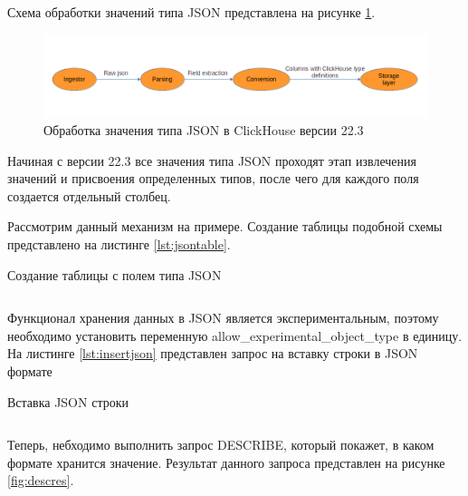 \documentclass[14pt, russian]{scrartcl}
\begin{document}
Схема обработки значений типа JSON представлена на рисунке \ref{fig:jsonprocessing}. 

\begin{figure}[H]
	\centering
	\begin{minipage}[t]{.9\textwidth}
		\centering
		\includegraphics[width=.7\textwidth]{./imgs/ingestion_process_crop.png}
	\end{minipage}
	\caption{Обработка значения типа JSON в ClickHouse версии 22.3}
	\label{fig:jsonprocessing}
\end{figure}

Начиная с версии 22.3 все значения типа JSON проходят
этап извлечения значений и присвоения определенных типов,
после чего для каждого поля создается отдельный столбец.

Рассмотрим данный механизм на примере. Создание таблицы подобной 
схемы представлено на листинге \ref{lst:jsontable}. 


\begin{listing}[H]
	\caption{Создание таблицы с полем типа JSON}
	\label{lst:jsontable}
	\inputminted[style=bw, frame=single,fontsize = \footnotesize, linenos=false, xleftmargin = 1.5em]{sql}{./listings/jsontable.sql}
\end{listing}

Функционал хранения данных в JSON является экспериментальным, поэтому
необходимо установить переменную allow\_experimental\_object\_type в единицу.
На листинге \ref{lst:insertjson} представлен запрос
на вставку строки в JSON формате

\begin{listing}[H]
	\caption{Вставка JSON строки}
	\label{lst:insertjson}
	\inputminted[style=bw, frame=single,fontsize = \footnotesize, linenos=false, xleftmargin = 1.5em]{sql}{./listings/inserjson.sql}
\end{listing}

Теперь, небходимо выполнить запрос DESCRIBE, который
покажет, в каком формате хранится значение. Результат
данного запроса представлен на рисунке \ref{fig:descres}. 
\end{document}
